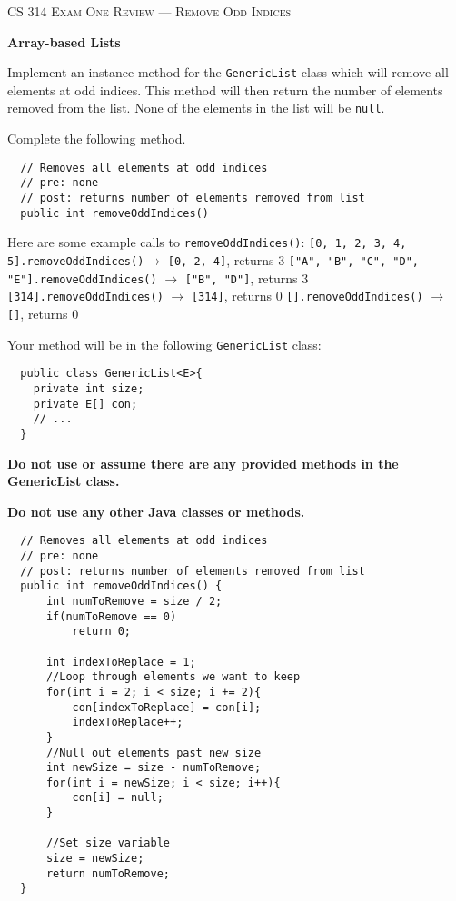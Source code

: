 \documentclass[12pt,letter]{article}
\begin{document}
\noindent\textsc{\large CS 314 Exam One Review --- Remove Odd Indices}

\vspace{6pt}
\noindent\textbf{Array-based Lists}

\vspace{2pt}
\noindent Implement an instance method for the \texttt{GenericList} class which will 
remove all elements at odd indices. This method will then return the number of elements
removed from the list. None of the elements in the list will be \texttt{null}.

\vspace{4pt}
\noindent Complete the following method.
\begin{verbatim}
  // Removes all elements at odd indices
  // pre: none
  // post: returns number of elements removed from list
  public int removeOddIndices()
\end{verbatim}

\vspace{4pt}

\noindent Here are some example calls to \texttt{removeOddIndices()}:
\newline
\noindent \texttt{[0, 1, 2, 3, 4, 5].removeOddIndices()}$ \rightarrow $ \texttt{[0, 2, 4]}, returns 3
\newline
\noindent \texttt{["A", "B", "C", "D", "E"].removeOddIndices()} $ \rightarrow $ \texttt{["B", "D"]}, returns 3
\newline
\noindent \texttt{[314].removeOddIndices()} $\rightarrow$ \texttt{[314]}, returns 0
\newline
\noindent \texttt{[].removeOddIndices()} $\rightarrow$ \texttt{[]}, returns 0
\newline

\noindent Your method will be in the following \texttt{GenericList} class:

\begin{verbatim}
  public class GenericList<E>{
    private int size;
    private E[] con;
    // ...
  }

\end{verbatim}

\noindent \textbf{Do not use or assume there are any provided methods in the GenericList class.}

\noindent \textbf{Do not use any other Java classes or methods.}

\clearpage
\begin{verbatim}
  // Removes all elements at odd indices
  // pre: none
  // post: returns number of elements removed from list
  public int removeOddIndices() {
      int numToRemove = size / 2;
      if(numToRemove == 0)
          return 0;

      int indexToReplace = 1;
      //Loop through elements we want to keep
      for(int i = 2; i < size; i += 2){
          con[indexToReplace] = con[i];
          indexToReplace++;
      }
      //Null out elements past new size
      int newSize = size - numToRemove;
      for(int i = newSize; i < size; i++){
          con[i] = null;
      }

      //Set size variable
      size = newSize;
      return numToRemove;
  } 
\end{verbatim}
\end{document}
